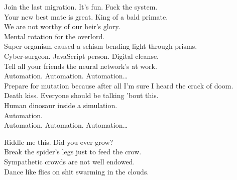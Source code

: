 \label{album:kg}








Join the last migration. It's fun. Fuck the system. \\
Your new best mate is great. King of a bald primate. \\
We are not worthy of our heir's glory. \\
Mental rotation for the overlord. \\

Super-organism caused a schism bending light through prisms. \\
Cyber-surgeon. JavaScript person. Digital cleanse. \\
Tell all your friends the neural network's at work. \\

Automation. Automation. Automation… \\

Prepare for mutation because after all I'm sure I heard the crack of doom. \\
Death kiss. Everyone should be talking 'bout this. \\
Human  dinosaur inside a simulation. \\
Automation. \\

Automation. Automation. Automation… \\




Riddle me this. Did you ever grow? \\
Break the spider's legs just to feed the crow. \\
Sympathetic crowds are not well endowed. \\
Dance like flies on shit swarming in the clouds. \\

